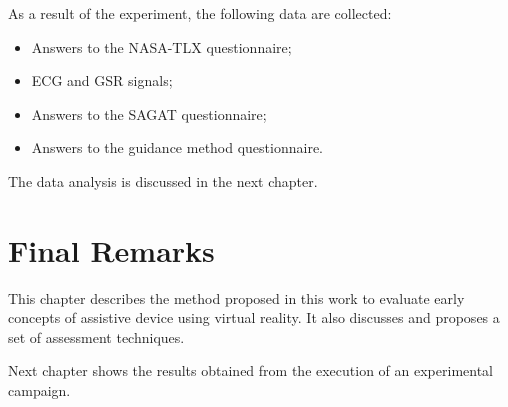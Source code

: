 As a result of the experiment, the following data are collected:

\begin{itemize}
    \item Answers to the NASA-TLX questionnaire;
    \item ECG and GSR signals;
    \item Answers to the SAGAT questionnaire;
    \item Answers to the guidance method questionnaire.
\end{itemize}

The data analysis is discussed in the next chapter.

\section{Final Remarks}

This chapter describes the method proposed in this work to evaluate early concepts of assistive device using virtual reality. It also discusses and proposes a set of assessment techniques. 

Next chapter shows the results obtained from the execution of an experimental campaign.